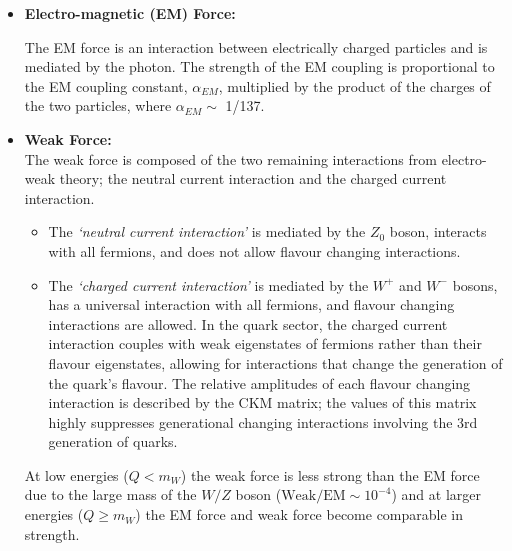 \begin{itemize}[leftmargin=*]
\item\textbf{Electro-magnetic (EM) Force:}

  The EM force is an interaction between electrically charged particles and is mediated by the photon.
  The strength of the EM coupling is proportional to the EM coupling constant, $\alpha_{EM}$,
  multiplied by the product of the charges of the two particles, where $\alpha_{EM} \sim$ 1/137.\vspace{1em} %

\item\textbf{Weak Force:} \\
  The weak force is composed of the two remaining interactions from electro-weak theory;
  the neutral current interaction and the charged current interaction.
  \begin{itemize}[leftmargin=*]  
  \item The \textit{`neutral current interaction'} is mediated by the $Z_0$ boson, interacts with all fermions,
    and does not allow flavour changing interactions.
  \item The \textit{`charged current interaction'} is mediated by the $W^+$ and $W^-$ bosons,
    has a universal interaction with all fermions,
    and flavour changing interactions are allowed.
    In the quark sector, the charged current interaction
    couples with weak eigenstates of fermions rather than their flavour eigenstates,
    allowing for interactions that change the generation of the quark's flavour.
    The relative amplitudes of each flavour changing interaction is described by the CKM matrix;
    the values of this matrix highly suppresses generational changing interactions involving the 3rd generation of quarks.
  \end{itemize}
  At low energies ($Q < m_W$) the weak force is less strong than the EM force due to the large mass of the $W/Z$ boson
  \mbox{($\text{Weak}/\text{EM} \sim 10^{-4}$)} and at larger energies ($Q \geq m_W$)
  the EM force and weak force become comparable in strength.\vspace{1em} %
  

\end{itemize}

